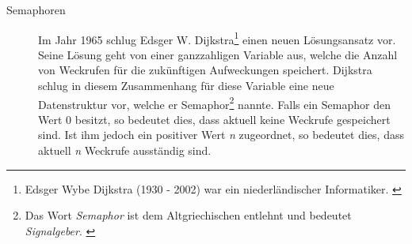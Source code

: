 \begin{description}
\begin{description}
							\item[Semaphoren]
							
								Im Jahr 1965 schlug Edsger W. Dijkstra\footnote{Edsger Wybe Dijkstra (1930 - 2002) war ein niederländischer Informatiker. \cite{DijkstraWikipedia}} einen neuen Lösungsansatz vor. Seine Lösung geht von einer ganzzahligen Variable aus, welche die Anzahl von Weckrufen für die zukünftigen Aufweckungen speichert. Dijkstra schlug in diesem Zusammenhang für diese Variable eine neue Datenstruktur vor, welche er Semaphor\footnote{Das Wort \textit{Semaphor} ist dem Altgriechischen entlehnt und bedeutet \textit{Signalgeber}. \cite{SemaphorWikipedia}} nannte. Falls ein Semaphor den Wert 0 besitzt, so bedeutet dies, dass aktuell keine Weckrufe gespeichert sind. Ist ihm jedoch ein positiver Wert \textit{n} zugeordnet, so bedeutet dies, dass aktuell \textit{n} Weckrufe ausständig sind.\\

\end{description}
\end{description}
